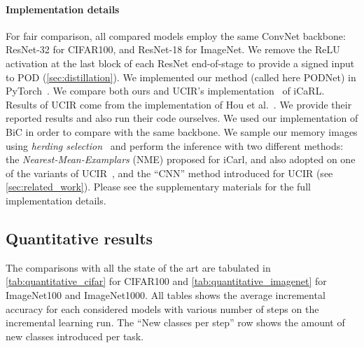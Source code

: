 \paragraph{Implementation details} For fair comparison, all compared models employ the same ConvNet
backbone: ResNet-32 for CIFAR100, and ResNet-18 for ImageNet. We remove the ReLU activation at the
last block of each ResNet end-of-stage to provide a signed input to POD
(\autoref{sec:distillation}). We implemented our method (called here PODNet) in
PyTorch~\citep{paszke2017pytorch}.
%
We compare both ours and UCIR's implementation~\citep{hou2019ucir} of iCaRL. Results of UCIR come
from the implementation of Hou et al.~\citep{hou2019ucir}. We provide their reported results and
also run their code ourselves. We used our implementation of BiC in order to compare with the same
backbone.
%
We sample our memory images using \textit{herding selection}~\citep{rebuffi2017icarl} and perform
the inference with two different methods: the \textit{Nearest-Mean-Examplars} (NME) proposed for
iCarl, and also adopted on one of the variants of UCIR~\citep{hou2019ucir}, and the ``CNN'' method
introduced for UCIR (see \autoref{sec:related_work}).
%
Please see the supplementary materials for the full implementation details.



\subsection{Quantitative results}
\label{sec:quantitative_results}

The comparisons with all the state of the art are tabulated in \autoref{tab:quantitative_cifar} for
CIFAR100 and \autoref{tab:quantitative_imagenet} for ImageNet100 and ImageNet1000. All tables shows
the average incremental accuracy for each considered models with various number of steps on the
incremental learning run. The ``New classes per step'' row shows the amount of new classes
introduced per task.

